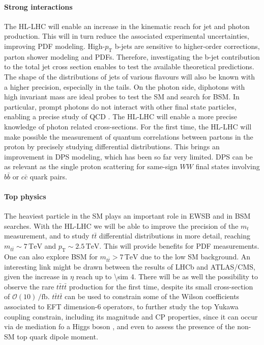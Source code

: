 \documentclass[11pt]{article}
\newcommand{\mt}{m_{t}}
\newcommand{\mtt}{m_{t\bar{t}}}
\newcommand{\pt}{p_{\text{T}}}
\begin{document}
\paragraph{Strong interactions}

The \ac{HL-LHC} will enable an increase in the kinematic reach for jet and photon production.
This will in turn reduce the associated experimental uncertainties, improving \ac{PDF} modeling.
High-\(\pt\) b-jets are sensitive to higher-order corrections, parton shower modeling and \acp{PDF}.
Therefore, investigating the b-jet contribution to the total jet cross section enables to test the available theoretical predictions.
The shape of the distributions of jets of various flavours will also be known with a higher precision, especially in the tails.
On the photon side, diphotons with high invariant mass are ideal probes to test the \ac{SM} and search for \ac{BSM}. In particular, prompt photons do not interact with other final state particles, enabling a precise study of \ac{QCD} \cite{diphoton_cdf}.
The \ac{HL-LHC} will enable a more precise knowledge of photon related cross-sections.
For the first time, the \ac{HL-LHC} will make possible the measurement of quantum correlations between partons in the proton by precisely studying differential distributions.
This brings an improvement in \ac{DPS} modeling, which has been so far very limited.
\ac{DPS} can be as relevant as the single proton scattering for same-sign \(WW\) final states involving \(b\bar{b}\) or \(c\bar{c}\) quark pairs.

\paragraph{Top physics}
The heaviest particle in the \ac{SM} plays an important role in \ac{EWSB} and in \ac{BSM} searches.
With the \ac{HL-LHC} we will be able to improve the precision of the \(\mt\) measurement, and to study \(t\bar{t}\) differential distributions in more detail, reaching \(\mtt\sim 7\,\si{\TeV}\) and \(\pt\sim 2.5\,\si{\TeV}\).
This will provide benefits for \ac{PDF} measurements.
One can also explore \ac{BSM} for \(\mtt > 7\,\si{\TeV}\) due to the low \ac{SM} background.
An interesting link might be drawn between the results of \ac{LHCb} and \ac{ATLAS}/\ac{CMS}, given the increase in \(\eta\) reach up to \num{\sim 4}.
There will be as well the possibility to observe the rare \(t\bar{t}t\bar{t}\) production for the first time, despite its small cross-section of \(\mathcal{O}(10)\,\si{\per\femto\barn}\).
\(t\bar{t}t\bar{t}\) can be used to constrain some of the Wilson coefficients associated to \ac{EFT} dimension-6 operators, to further study the top Yukawa coupling constrain, including its magnitude and \ac{CP} properties, since it can occur via de mediation fo a Higgs boson \cite{tttt}, and even to assess the presence of the non-\ac{SM} top quark dipole moment.
\end{document}
